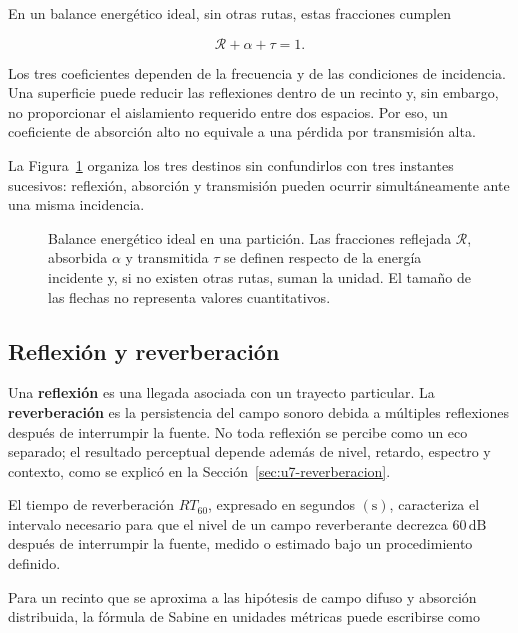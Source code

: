 En un balance energético ideal, sin otras rutas, estas fracciones
cumplen~\cite{xiangBlauert2021}

\begin{equation}
    \mathcal{R}+\alpha+\tau=1.
    \label{eq:u9-balance-superficie}
\end{equation}

Los tres coeficientes dependen de la frecuencia y de las condiciones de
incidencia. Una superficie puede reducir las reflexiones dentro de un recinto
y, sin embargo, no proporcionar el aislamiento requerido entre dos espacios.
Por eso, un coeficiente de absorción alto no equivale a una pérdida por
transmisión alta.

La Figura~\ref{fig:u9-balance-superficie} organiza los tres destinos sin
confundirlos con tres instantes sucesivos: reflexión, absorción y transmisión
pueden ocurrir simultáneamente ante una misma incidencia.

\begin{figure}[htbp]
    \centering
    
    \caption{Balance energético ideal en una partición. Las fracciones
    reflejada \(\mathcal{R}\), absorbida \(\alpha\) y transmitida \(\tau\)
    se definen respecto de la energía incidente y, si no existen otras rutas,
    suman la unidad. El tamaño de las flechas no representa valores
    cuantitativos.}
    \label{fig:u9-balance-superficie}
\end{figure}

\subsection{Reflexión y reverberación}
\label{sec:u9-reverberacion}

Una \textbf{reflexión} es una llegada asociada con un trayecto particular. La
\textbf{reverberación} es la persistencia del campo sonoro debida a múltiples
reflexiones después de interrumpir la fuente. No toda reflexión se percibe
como un eco separado; el resultado perceptual depende además de nivel, retardo,
espectro y contexto, como se explicó en la
Sección~\ref{sec:u7-reverberacion}.

El tiempo de reverberación \(RT_{60}\), expresado en segundos
\((\text{s})\), caracteriza el intervalo necesario para que el nivel de un
campo reverberante decrezca \(60\,\text{dB}\) después de interrumpir la fuente,
medido o estimado bajo un procedimiento definido.

Para un recinto que se aproxima a las hipótesis de campo difuso y
absorción distribuida, la fórmula de Sabine en unidades métricas puede
escribirse como~\cite{moser2009,iso3382_2_2008}

